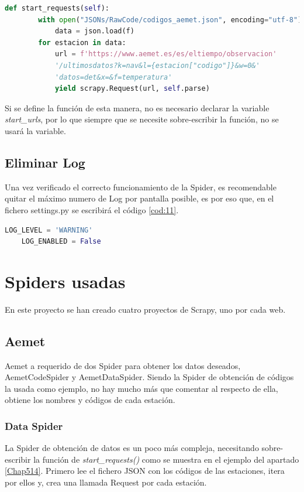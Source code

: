 \begin{lstlisting}[language=Python, caption={Sobre-escritura de \textit{start\_requests()}}, label=cod:10]
	def start_requests(self):
		with open("JSONs/RawCode/codigos_aemet.json", encoding="utf-8") as f:
			data = json.load(f)
		for estacion in data:
			url = f'https://www.aemet.es/es/eltiempo/observacion'
			'/ultimosdatos?k=nav&l={estacion["codigo"]}&w=0&'
			'datos=det&x=&f=temperatura'
			yield scrapy.Request(url, self.parse)
\end{lstlisting}

Si se define la función de esta manera, no es necesario declarar la variable \textit{start\_urls}, por lo que siempre que se necesite sobre-escribir la función, no se usará la variable.

\subsection{Eliminar Log}
Una vez verificado el correcto funcionamiento de la Spider, es recomendable quitar el máximo numero de Log por pantalla posible, es por eso que, en el fichero settings.py se escribirá el código \ref{cod:11}.

\begin{lstlisting}[language=Python, caption={Configurar desactivado del LOG de las Spider}, label=cod:11]
	LOG_LEVEL = 'WARNING'
	LOG_ENABLED = False
\end{lstlisting}

\section{Spiders usadas}
En este proyecto se han creado cuatro proyectos de Scrapy, uno por cada web.

\subsection{Aemet}
Aemet a requerido de dos Spider para obtener los datos deseados, AemetCodeSpider y AemetDataSpider. Siendo la Spider de obtención de códigos la usada como ejemplo, no hay mucho más que comentar al respecto de ella, obtiene los nombres y códigos de cada estación.

\subsubsection{Data Spider}
La Spider de obtención de datos es un poco más compleja, necesitando sobre-escribir la función de \textit{start\_requests()} como se muestra en el ejemplo del apartado \ref{Chap514}. Primero lee el fichero JSON con los códigos de las estaciones, itera por ellos y, crea una llamada Request por cada estación.

